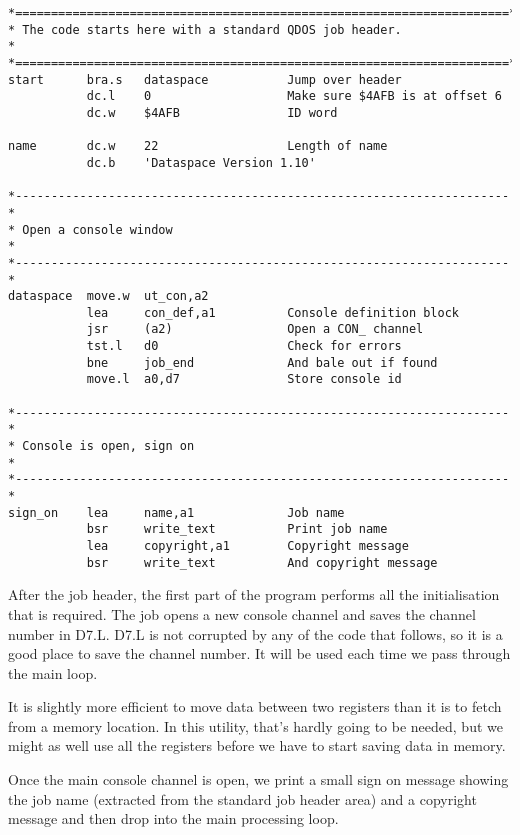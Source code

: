 \begin{lstlisting}[firstnumber=last,caption={Dataspace Program - Part 1 - Initialisation}]
*=====================================================================*
* The code starts here with a standard QDOS job header.               *
*=====================================================================*
start      bra.s   dataspace           Jump over header
           dc.l    0                   Make sure $4AFB is at offset 6
           dc.w    $4AFB               ID word

name       dc.w    22                  Length of name
           dc.b    'Dataspace Version 1.10'

*---------------------------------------------------------------------*
* Open a console window                                               *
*---------------------------------------------------------------------*
dataspace  move.w  ut_con,a2
           lea     con_def,a1          Console definition block
           jsr     (a2)                Open a CON_ channel
           tst.l   d0                  Check for errors
           bne     job_end             And bale out if found
           move.l  a0,d7               Store console id

*---------------------------------------------------------------------*
* Console is open, sign on                                            *
*---------------------------------------------------------------------*
sign_on    lea     name,a1             Job name
           bsr     write_text          Print job name
           lea     copyright,a1        Copyright message
           bsr     write_text          And copyright message
\end{lstlisting}

After the job header, the first part of the program performs all the
    initialisation that is required. The job opens a new console channel and
    saves the channel number in D7.L. D7.L is not corrupted by any of the code
    that follows, so it is a good place to save the channel number. It will be
    used each time we pass through the main loop.

It is slightly more efficient to move data between two registers
    than it is to fetch from a memory location. In this utility, that's hardly
    going to be needed, but we might as well use all the registers before we
    have to start saving data in memory.

Once the main console channel is open, we print a small sign on
    message showing the job name (extracted from the standard job header area)
    and a copyright message and then drop into the main processing
    loop.

